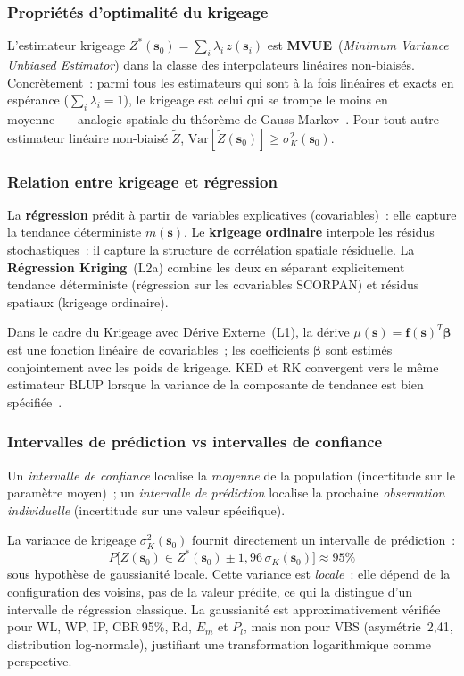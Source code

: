 \documentclass[10pt,a4paper,twocolumn]{article}
\newcommand{\bs}{\mathbf{s}}
\begin{document}
	\subsubsection{Propriétés d'optimalité du krigeage}
	
	L'estimateur krigeage $Z^*(\bs_0)=\sum_i\lambda_i\,z(\bs_i)$ est
	\textbf{MVUE}~(\textit{Minimum Variance Unbiased Estimator}) dans la
	classe des interpolateurs linéaires non-biaisés.
	Concrètement~: parmi tous les estimateurs qui sont à la fois linéaires
	et exacts en espérance ($\sum_i\lambda_i=1$), le krigeage est celui
	qui se trompe le moins en moyenne~--- analogie spatiale du
	théorème de Gauss-Markov~\cite{chilesdelfiner2012}.
	Pour tout autre estimateur linéaire non-biaisé $\tilde{Z}$,
	$\mathrm{Var}[\tilde{Z}(\bs_0)]\geq\sigma^2_K(\bs_0)$.
	
	\subsubsection{Relation entre krigeage et régression}
	
	La \textbf{régression} prédit à partir de variables explicatives
	(covariables)~: elle capture la tendance déterministe $m(\bs)$.
	Le \textbf{krigeage ordinaire} interpole les résidus stochastiques~:
	il capture la structure de corrélation spatiale résiduelle.
	La \textbf{Régression Kriging}~(L2a) combine les deux en séparant
	explicitement tendance déterministe (régression sur les covariables
	SCORPAN) et résidus spatiaux (krigeage ordinaire).
	
	Dans le cadre du Krigeage avec Dérive Externe~(L1), la dérive
	$\mu(\bs)=\mathbf{f}(\bs)^T\bm{\beta}$ est une fonction linéaire
	de covariables~; les coefficients $\bm{\beta}$ sont estimés
	conjointement avec les poids de krigeage. KED et RK convergent
	vers le même estimateur BLUP lorsque la variance de la composante
	de tendance est bien spécifiée~\cite{cressie1993statistics}.
	
	\subsubsection{Intervalles de prédiction vs intervalles de confiance}
	
	Un \emph{intervalle de confiance} localise la \emph{moyenne} de la
	population (incertitude sur le paramètre moyen)~; un
	\emph{intervalle de prédiction} localise la prochaine
	\emph{observation individuelle} (incertitude sur une valeur spécifique).
	
	La variance de krigeage $\sigma^2_K(\bs_0)$ fournit directement
	un intervalle de prédiction~:
	\begin{equation}
		P\!\bigl[Z(\bs_0)\in
		Z^*(\bs_0)\pm1{,}96\,\sigma_K(\bs_0)\bigr]\approx95\%
		\label{eq:ic95}
	\end{equation}
	sous hypothèse de gaussianité locale.
	Cette variance est \emph{locale}~: elle dépend de la configuration
	des voisins, pas de la valeur prédite, ce qui la distingue
	d'un intervalle de régression classique.
	La gaussianité est approximativement vérifiée pour WL, WP, IP,
	CBR\,95\%, Rd, $E_m$ et $P_l$, mais non pour VBS
	(asymétrie~2{,}41, distribution log-normale), justifiant
	une transformation logarithmique comme perspective.
	
\end{document}
